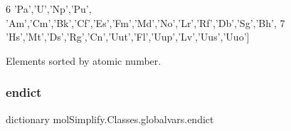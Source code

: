 \begin{DoxyCode}
6             \textcolor{stringliteral}{'Pa'},\textcolor{stringliteral}{'U','}Np','Pu', 'Am','Cm','Bk','Cf','Es','Fm','Md','No','Lr','Rf','Db','Sg','Bh',
7             \textcolor{stringliteral}{'Hs'},\textcolor{stringliteral}{'Mt'},\textcolor{stringliteral}{'Ds'},\textcolor{stringliteral}{'Rg'},\textcolor{stringliteral}{'Cn'},\textcolor{stringliteral}{'Uut'},\textcolor{stringliteral}{'Fl'},\textcolor{stringliteral}{'Uup'},\textcolor{stringliteral}{'Lv'},\textcolor{stringliteral}{'Uus'},\textcolor{stringliteral}{'Uuo'}]
\end{DoxyCode}


Elements sorted by atomic number. 

\mbox{\label{namespacemolSimplify_1_1Classes_1_1globalvars_a01f6eb6722ce46d78ee3004480cbd069}} 
\subsubsection{\texorpdfstring{endict}{endict}}
{\footnotesize\ttfamily dictionary mol\+Simplify.\+Classes.\+globalvars.\+endict}

